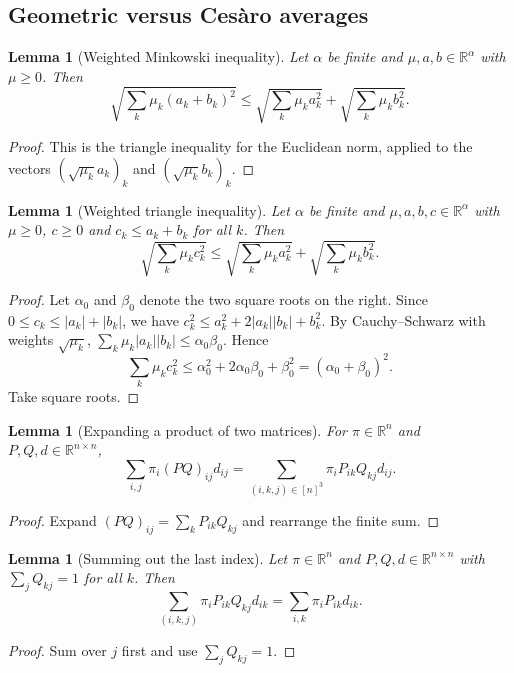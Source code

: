 \documentclass[11pt]{article}
\newtheorem{lemma}[theorem]{Lemma}
\theoremstyle{definition}
\theoremstyle{remark}
\newcommand{\R}{\mathbb{R}}
\begin{document}
\subsection{Geometric versus Ces\`aro averages}

\begin{lemma}[Weighted Minkowski inequality]\label{lem:mc_minkowski}
Let $\alpha$ be finite and $\mu,a,b\in\R^\alpha$ with $\mu\ge0$. Then
\[
\sqrt{\sum_k\mu_k(a_k+b_k)^2}\le\sqrt{\sum_k\mu_ka_k^2}+\sqrt{\sum_k\mu_kb_k^2}.
\]
\end{lemma}
\begin{proof}
This is the triangle inequality for the Euclidean norm, applied to the vectors $(\sqrt{\mu_k}a_k)_k$ and $(\sqrt{\mu_k}b_k)_k$.
\end{proof}

\begin{lemma}[Weighted triangle inequality]\label{lem:mc_weighted_tri}
Let $\alpha$ be finite and $\mu,a,b,c\in\R^\alpha$ with $\mu\ge0$, $c\ge0$ and $c_k\le a_k+b_k$ for all $k$. Then
\[
\sqrt{\sum_k\mu_kc_k^2}\le\sqrt{\sum_k\mu_ka_k^2}+\sqrt{\sum_k\mu_kb_k^2}.
\]
\end{lemma}
\begin{proof}
Let $\alpha_0$ and $\beta_0$ denote the two square roots on the right. Since $0\le c_k\le|a_k|+|b_k|$, we have $c_k^2\le a_k^2+2|a_k||b_k|+b_k^2$. By Cauchy--Schwarz with weights $\sqrt{\mu_k}$, $\sum_k\mu_k|a_k||b_k|\le\alpha_0\beta_0$. Hence
\[
\sum_k\mu_kc_k^2\le\alpha_0^2+2\alpha_0\beta_0+\beta_0^2=(\alpha_0+\beta_0)^2 .
\]
Take square roots.
\end{proof}

\begin{lemma}[Expanding a product of two matrices]\label{lem:mc_triple_mul}
For $\pi\in\R^n$ and $P,Q,d\in\R^{n\times n}$,
\[
\sum_{i,j}\pi_i(PQ)_{ij}d_{ij}=\sum_{(i,k,j)\in[n]^3}\pi_iP_{ik}Q_{kj}d_{ij}.
\]
\end{lemma}
\begin{proof}
Expand $(PQ)_{ij}=\sum_kP_{ik}Q_{kj}$ and rearrange the finite sum.
\end{proof}

\begin{lemma}[Summing out the last index]\label{lem:mc_triple_first}
Let $\pi\in\R^n$ and $P,Q,d\in\R^{n\times n}$ with $\sum_jQ_{kj}=1$ for all $k$. Then
\[
\sum_{(i,k,j)}\pi_iP_{ik}Q_{kj}d_{ik}=\sum_{i,k}\pi_iP_{ik}d_{ik}.
\]
\end{lemma}
\begin{proof}
Sum over $j$ first and use $\sum_jQ_{kj}=1$.
\end{proof}
\end{document}
